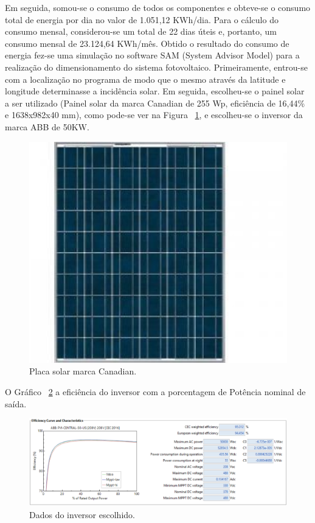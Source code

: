 Em seguida, somou-se o consumo de todos os componentes e obteve-se o consumo total de energia por dia no valor de 1.051,12 KWh/dia. Para o cálculo do consumo mensal, considerou-se um total de 22 dias úteis  e, portanto, um consumo mensal de 23.124,64 KWh/mês.
Obtido o resultado do consumo de energia fez-se uma simulação no software SAM (System Advisor Model) para a realização do dimensionamento do sistema fotovoltaico. Primeiramente, entrou-se com a localização no programa de modo que o mesmo através da latitude e longitude determinasse a incidência solar. Em seguida, escolheu-se o painel solar a ser utilizado (Painel solar da marca Canadian de 255 Wp, eficiência de 16,44\% e 1638x982x40 mm), como pode-se ver na Figura ~\ref{fig:placa}, e escolheu-se o inversor da marca ABB de 50KW.

\begin{figure}[!h]
  \centering
  \includegraphics[keepaspectratio=true,scale=0.8]{figuras/placa.eps}
  \caption{Placa solar marca Canadian.}
  \label{fig:placa}
\end{figure}

O Gráfico ~\ref{fig:smartgrid1} a eficiência do inversor com a porcentagem de Potência nominal de saída.

\begin{figure}[!h]
  \centering
  \includegraphics[keepaspectratio=true,scale=0.5]{figuras/smartgrid1.eps}
  \caption{Dados do inversor escolhido.}
  \label{fig:smartgrid1}
\end{figure}

